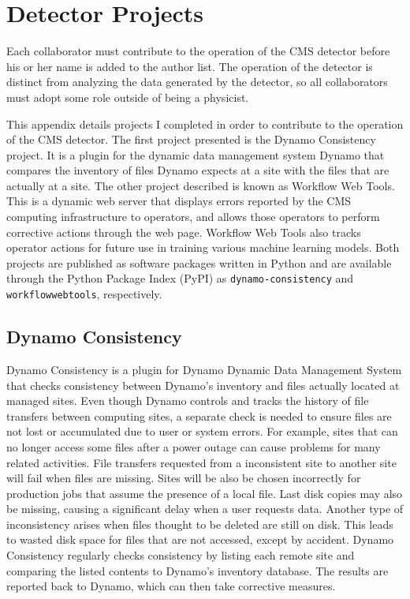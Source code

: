 \chapter{Detector Projects} \label{app:project}

Each collaborator must contribute to the operation of the CMS detector
before his or her name is added to the author list.
The operation of the detector is distinct from analyzing the data generated by the detector,
so all collaborators must adopt some role outside of being a physicist.

This appendix details projects I completed
in order to contribute to the operation of the CMS detector.
The first project presented is the Dynamo Consistency project.
It is a plugin for the dynamic data management system Dynamo \cite{iiyama2020dynamo}
that compares the inventory of files Dynamo expects at a site
with the files that are actually at a site.
The other project described is known as Workflow Web Tools.
This is a dynamic web server that displays errors reported
by the CMS computing infrastructure to operators,
and allows those operators to perform corrective actions through the web page.
Workflow Web Tools also tracks operator actions for future use
in training various machine learning models.
Both projects are published as software packages written in Python
\cite{van1995python, 10.5555/1593511}
and are available through the Python Package Index (PyPI) as
\texttt{dynamo-consistency} and \texttt{workflowwebtools}, respectively.


\section{Dynamo Consistency}

Dynamo Consistency is a plugin for Dynamo Dynamic Data Management System that checks
consistency between Dynamo’s inventory and files actually located at managed sites.
Even though Dynamo controls and tracks the history of file transfers between computing sites,
a separate check is needed to ensure files are
not lost or accumulated due to user or system errors.
For example, sites that can no longer access some files after a power outage
can cause problems for many related activities.
File transfers requested from a inconsistent site to another site will fail
when files are missing.
Sites will be also be chosen incorrectly for production jobs
that assume the presence of a local file.
Last disk copies may also be missing, causing a significant delay when a user requests data.
Another type of inconsistency arises when files thought to be deleted are still on disk.
This leads to wasted disk space for files that are not accessed, except by accident.
Dynamo Consistency regularly checks consistency by listing each remote site and
comparing the listed contents to Dynamo’s inventory database.
The results are reported back to Dynamo, which can then take corrective measures.

